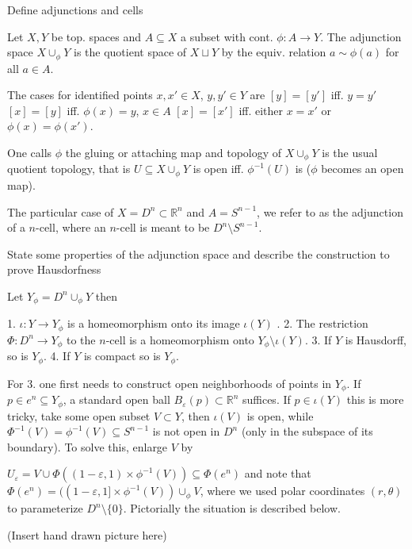 Define adjunctions and cells

Let \( X, Y \) be top. spaces and \( A \subseteq X \) a subset with cont. \( \phi : A \to Y \).
The adjunction space \( X \cup_{\phi} Y\) is the quotient space of \( X \sqcup Y \) by the equiv. relation \( a \sim \phi(a) \)
for all \( a \in A \).

The cases for identified points \( x, x' \in X \), \( y, y' \in Y \)
are
\( [y] = [y'] \) iff. \( y = y' \)
\( [x] = [y] \) iff. \( \phi(x) = y \), \( x \in A \)
\( [x] = [x'] \) iff. either \( x = x' \) or \( \phi(x) = \phi(x') \).

One calls \( \phi \) the gluing or attaching map and topology of \( X \cup_{\phi} Y \) is the usual quotient topology,
that is \( U \subseteq X \cup_{\phi} Y \) is open iff. \( \phi^{-1}(U) \) is (\( \phi \) becomes an open map).

The particular case of \( X = D^n \subset \mathbb{R}^n \) and \( A = S^{n-1} \), we refer to as the adjunction of a \( n \)-cell,
where an \( n \)-cell is meant to be \( D^n \setminus S^{n-1} \).


State some properties of the adjunction space and describe the construction to prove Hausdorfness

Let \( Y_\phi = D^n \cup_\phi Y \) then

1. \( \iota : Y \to Y_\phi \) is a homeomorphism onto its image \( \iota(Y) \) .
2. The restriction \( \Phi : D^n \to Y_{\phi} \) to the \( n \)-cell is a homeomorphism onto \( Y_\phi \setminus \iota(Y) \).
3. If \( Y \) is Hausdorff, so is \( Y_\phi \).
4. If \( Y \) is compact so is \( Y_\phi \).

For 3. one first needs to construct open neighborhoods of points in \( Y_\phi \).
If \( p \in e^n \subseteq Y_\phi \), a standard open ball \( B_\varepsilon(p) \subset \mathbb{R}^n \) suffices.
If \( p \in \iota(Y) \) this is more tricky, take some open subset \( V \subset Y \), then \( \iota(V) \) is open,
while \( \Phi^{-1}(V) = \phi^{-1}(V) \subseteq S^{n-1} \) is not open in \( D^n \) (only in the subspace of its boundary).
To solve this, enlarge \( V \) by

\( U_{\varepsilon} = V \cup \Phi((1 - \varepsilon, 1) \times \phi^{-1}(V)) \subseteq \Phi(e^n) \)
and note that \( \Phi(e^n) = ((1 - \varepsilon, 1] \times \phi^{-1}(V)) \cup_\phi V\),
where we used polar coordinates \( (r, \theta) \) to parameterize \( D^n \setminus \{0\} \).
Pictorially the situation is described below.

(Insert hand drawn picture here)


